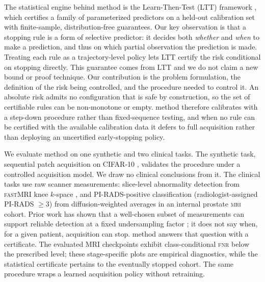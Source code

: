The statistical engine behind \gls{method} is the Learn-Then-Test (LTT) framework \citep{angelopoulos2025learn}, which certifies a family of parameterized predictors on a held-out calibration set with finite-sample, distribution-free guarantees. Our key observation is that a stopping rule is a form of selective predictor: it decides both \emph{whether} and \emph{when} to make a prediction, and thus on which partial observation the prediction is made. Treating each rule as a trajectory-level policy lets LTT certify the risk conditional on stopping directly. This guarantee comes from LTT and we do not claim a new bound or proof technique. 
Our contribution is the problem formulation, the definition of the risk being controlled, and the procedure needed to control it. 
An absolute risk admits no configuration that is safe by construction, so the set of certifiable rules can be non-monotone or empty. 
\gls{method} therefore calibrates with a step-down procedure rather than fixed-sequence testing, and when no rule can be certified with the available calibration data it defers to full acquisition rather than deploying an uncertified early-stopping policy.

We evaluate \gls{method} on one synthetic and two clinical tasks. The synthetic task, sequential patch acquisition on \textsc{CIFAR-10} \citep{cifar10}, validates the procedure under a controlled acquisition model. 
We draw no clinical conclusions from it. 
The clinical tasks use raw scanner measurements: slice-level abnormality detection from \textsc{fastMRI} knee $k$-space \citep{zbontar2018fastmri}, and PI-RADS-positive classification (radiologist-assigned PI-RADS $\geq 3$) from diffusion-weighted averages in an internal prostate \textsc{mri} cohort. 
Prior work has shown that a well-chosen subset of measurements can support reliable detection at a fixed undersampling factor \citep{singhal2023feasibility,ASMR}; it does not say when, for a given patient, acquisition can stop. \gls{method} answers that question with a certificate. The evaluated MRI checkpoints exhibit class-conditional \textsc{fnr} below the prescribed level; these stage-specific plots are empirical diagnostics, while the statistical certificate pertains to the eventually stopped cohort. The same procedure wraps a learned acquisition policy \citep{jafa-2018} without retraining.

